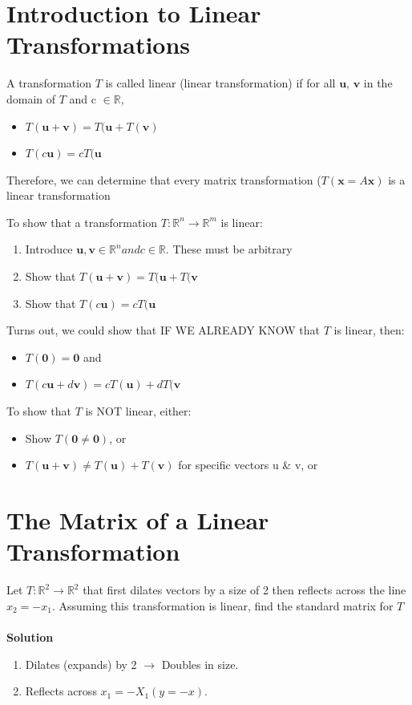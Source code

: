 \documentclass{report}
\begin{document}
\section{Introduction to Linear Transformations}

\begin{definition}
A transformation $T$ is called linear (linear transformation) if for all $\mathbf{u}$, $\mathbf{v}$ in the domain of $T$ and c $\in \mathbb{R}$,
\begin{itemize}
	\item $T(\mathbf{u}+\mathbf{v}) = T(\mathbf{u} + T(\mathbf{v})$
	\item $T(c\mathbf{u}) = cT(\mathbf{u}$
\end{itemize}
Therefore, we can determine that every matrix transformation ($T(\mathbf{x} = A\mathbf{x})$ is a linear transformation
\end{definition}
To show that a transformation $T:\mathbb{R}^n \rightarrow \mathbb{R}^m$ is linear:
\begin{enumerate}
	\item Introduce $\mathbf{u}, \mathbf{v}\in\mathbb{R}^n and c\in\mathbb{R}.$ These must be arbitrary
	\item Show that $T(\mathbf{u}+\mathbf{v}) = T(\mathbf{u} + T(\mathbf{v}$
	\item Show that $T(c\mathbf{u}) = cT(\mathbf{u}$
\end{enumerate}
Turns out, we could show that IF WE ALREADY KNOW that $T$ is linear, then:
\begin{itemize}
	\item $T(\mathbf{0}) = \mathbf{0}$ and
	\item $T(c\mathbf{u}+d\mathbf{v}) = cT(\mathbf{u}) + dT(\mathbf{v}$
\end{itemize}
To show that $T$ is NOT linear, either:
\begin{itemize}
	\item Show $T(\mathbf{0}\neq\mathbf{0})$, or
	\item $T(\mathbf{u} + \mathbf{v}) \neq T(\mathbf{u}) + T(\mathbf{v})$ for specific vectors u \& v, or
\end{itemize}
\section{The Matrix of a Linear Transformation}

\begin{example}
Let $T:\mathbb{R}^2\rightarrow\mathbb{R}^2$ that first dilates vectors by a size of 2 then reflects across the line $x_2=-x_1$. Assuming this transformation is linear, find the standard matrix for $T$\\
\\
\textbf{Solution}
\begin{enumerate}
	\item Dilates (expands) by 2 $\rightarrow$ Doubles in size.
	\item Reflects across $x_1=-X_1 (y=-x)$.
\end{enumerate}
\end{example}
\end{document}
